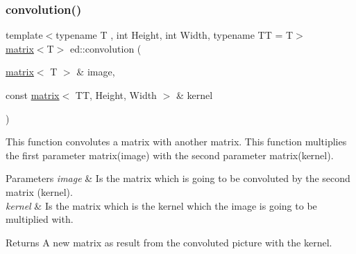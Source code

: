 \subsubsection{\texorpdfstring{convolution()}{convolution()}}
{\footnotesize\ttfamily template$<$typename T , int Height, int Width, typename TT  = T$>$ \\
\mbox{\hyperlink{classed_1_1matrix}{matrix}}$<$T$>$ ed\+::convolution (\begin{DoxyParamCaption}\item[{\mbox{\hyperlink{classed_1_1matrix}{matrix}}$<$ T $>$ \&}]{image,  }\item[{const \mbox{\hyperlink{classed_1_1matrix}{matrix}}$<$ TT, Height, Width $>$ \&}]{kernel }\end{DoxyParamCaption})}



This function convolutes a matrix with another matrix. This function multiplies the first parameter matrix(image) with the second parameter matrix(kernel). 


\begin{DoxyParams}{Parameters}
{\em image} & Is the matrix which is going to be convoluted by the second matrix (kernel). \\
\hline
{\em kernel} & Is the matrix which is the kernel which the image is going to be multiplied with.\\
\hline
\end{DoxyParams}
\begin{DoxyReturn}{Returns}
A new matrix as result from the convoluted picture with the kernel. 
\end{DoxyReturn}
